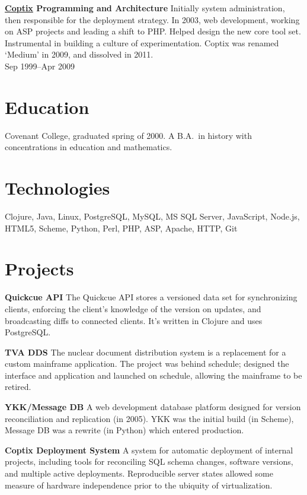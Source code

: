 \documentclass[margin]{res}
\begin{document}
\begin{resume}
{\bf \href{http://thisismedium.com/}{Coptix} Programming and Architecture}
%
Initially system administration, then responsible for the deployment
strategy. In 2003, web development, working on ASP projects and
leading a shift to PHP. Helped design the new core tool set.
Instrumental in building a culture of experimentation. Coptix was
renamed `Medium' in 2009, and dissolved in 2011.\\
%
Sep 1999--Apr 2009

\section{Education}

Covenant College, graduated spring of 2000. A B.A.\ in
history with concentrations in education and mathematics.

\section{Technologies}

Clojure, Java, Linux,
PostgreSQL, MySQL, MS SQL Server,
JavaScript, Node.js, HTML5,
Scheme, Python, Perl, PHP, ASP,
Apache, HTTP, Git

\section{Projects}
{\bf Quickcue API} The Quickcue API stores a versioned data set for
synchronizing clients, enforcing the client's knowledge of the version
on updates, and broadcasting diffs to connected clients. It's written
in Clojure and uses PostgreSQL.

{\bf TVA DDS} The nuclear document distribution system is a
replacement for a custom mainframe application. The project was behind
schedule; designed the interface and application and launched on
schedule, allowing the mainframe to be retired.

{\bf YKK/Message DB} A web development database platform designed for
version reconciliation and replication (in 2005). YKK was the initial
build (in Scheme), Message DB was a rewrite (in Python) which entered
production.

{\bf Coptix Deployment System} A system for automatic deployment of
internal projects, including tools for reconciling SQL schema changes,
software versions, and multiple active deployments. Reproducible
server states allowed some measure of hardware independence prior to
the ubiquity of virtualization.

\end{resume}
\end{document}
